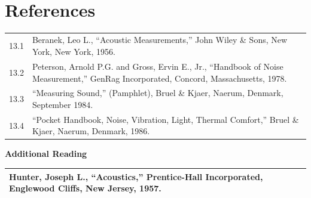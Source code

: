 \documentclass[
]{book}
\begin{document}
~

\hypertarget{references}{%
\section{References}\label{references}}

\begin{longtable}[]{@{}ll@{}}
\toprule
\endhead
\begin{minipage}[t]{0.06\columnwidth}\raggedright
13.1\strut
\end{minipage} & \begin{minipage}[t]{0.88\columnwidth}\raggedright
Beranek, Leo L., ``Acoustic Measurements,'' John Wiley \& Sons, New York, New York, 1956.\strut
\end{minipage}\tabularnewline
\begin{minipage}[t]{0.06\columnwidth}\raggedright
13.2\strut
\end{minipage} & \begin{minipage}[t]{0.88\columnwidth}\raggedright
Peterson, Arnold P.G. and Gross, Ervin E., Jr., ``Handbook of Noise Measurement,'' GenRag Incorporated, Concord, Massachusetts, 1978.\strut
\end{minipage}\tabularnewline
\begin{minipage}[t]{0.06\columnwidth}\raggedright
13.3\strut
\end{minipage} & \begin{minipage}[t]{0.88\columnwidth}\raggedright
``Measuring Sound,'' (Pamphlet), Bruel \& Kjaer, Naerum, Denmark, September 1984.\strut
\end{minipage}\tabularnewline
\begin{minipage}[t]{0.06\columnwidth}\raggedright
13.4\strut
\end{minipage} & \begin{minipage}[t]{0.88\columnwidth}\raggedright
``Pocket Handbook, Noise, Vibration, Light, Thermal Comfort,'' Bruel \& Kjaer, Naerum, Denmark, 1986.\strut
\end{minipage}\tabularnewline
\bottomrule
\end{longtable}

\textbf{Additional Reading}

\begin{longtable}[]{@{}l@{}}
\toprule
\endhead
\begin{minipage}[t]{0.97\columnwidth}\raggedright
Hunter, Joseph L., ``Acoustics,'' Prentice-Hall Incorporated, Englewood Cliffs, New Jersey, 1957.\strut
\end{minipage}\tabularnewline
\bottomrule
\end{longtable}
\end{document}

